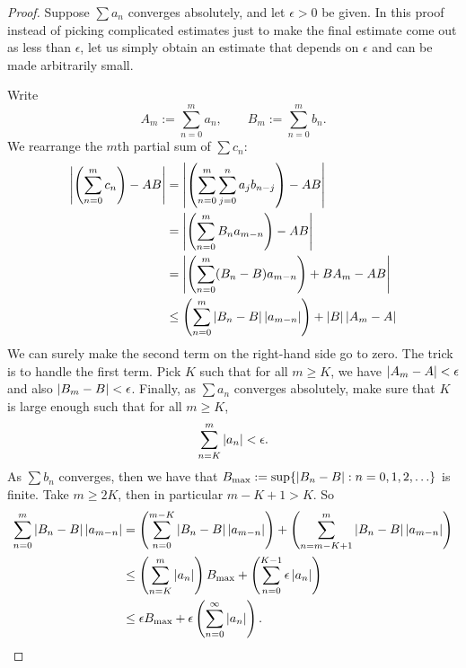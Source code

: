 \begin{proof}
Suppose $\sum a_n$ converges absolutely, and let $\epsilon > 0$ be
given.
In this proof instead of picking complicated estimates just to make
the final estimate come out as less than $\epsilon$,
let us simply obtain an estimate that depends on $\epsilon$
and can be made arbitrarily small.

Write
\begin{equation*}
A_m := \sum_{n=0}^m a_n , \qquad B_m := \sum_{n=0}^m b_n .
\end{equation*}
We rearrange the $m$th partial sum of $\sum c_n$:
\begin{equation*}
\begin{split}
\left\lvert {\left(\sum_{n=0}^m c_n \right) - AB} \right\rvert
& =
\left\lvert {\left( \sum_{n=0}^m \sum_{j=0}^n a_j b_{n-j} \right) - AB} \right\rvert
\\
& =
\left\lvert {\left( \sum_{n=0}^m
  B_n a_{m-n} \right) - AB} \right\rvert
\\
& =
\left\lvert {\left( \sum_{n=0}^m
  ( B_n -  B ) a_{m-n} \right)
    + B A_m - AB} \right\rvert
\\
& \leq
\left(
\sum_{n=0}^m
  \left\lvert { B_n -  B } \right\rvert \left\lvert {a_{m-n}} \right\rvert
\right)
+
\left\lvert {B} \right\rvert\left\lvert {A_m - A} \right\rvert
\end{split}
\end{equation*}
We can surely make the second term on the right-hand side go to zero.
The trick is to handle the first term.
Pick $K$ such that for all $m \geq K$, we have 
$\left\lvert {A_m - A} \right\rvert < \epsilon$ and
also
$\left\lvert {B_m - B} \right\rvert < \epsilon$.  Finally,
as $\sum a_n$ converges absolutely,
make sure that $K$ is large enough such that
for all $m \geq K$,
\begin{equation*}
\sum_{n=K}^m \left\lvert {a_n} \right\rvert < \epsilon .
\end{equation*}
As $\sum b_n$ converges, then
we have that
$B_{\text{max}} := \sup \{ \left\lvert { B_n - B } \right\rvert : n = 0,1,2,\ldots \}$
is finite.  Take $m \geq 2K$, then in particular $m-K+1 > K$.  So
\begin{equation*}
\begin{split}
\sum_{n=0}^m
  \left\lvert { B_n -  B } \right\rvert \left\lvert {a_{m-n}} \right\rvert
& =
\left(
\sum_{n=0}^{m-K}
  \left\lvert { B_n -  B } \right\rvert \left\lvert {a_{m-n}} \right\rvert
\right)
+
\left(
\sum_{n=m-K+1}^m
  \left\lvert { B_n -  B } \right\rvert \left\lvert {a_{m-n}} \right\rvert
\right)
\\
& \leq
\left(
\sum_{n=K}^m
\left\lvert {a_{n}} \right\rvert
\right)
B_{\text{max}}
+
\left(
\sum_{n=0}^{K-1}
  \epsilon \left\lvert {a_{n}} \right\rvert
\right)
\\
& \leq
\epsilon
B_{\text{max}}
+
\epsilon
\left(
\sum_{n=0}^\infty \left\lvert {a_{n}} \right\rvert
\right) .
\end{split}
\end{equation*}

\end{proof}

